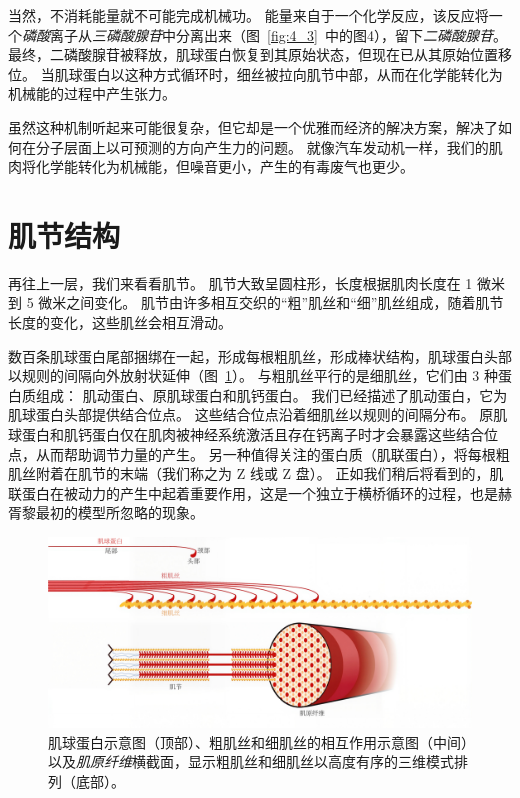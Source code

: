 当然，不消耗能量就不可能完成机械功。
能量来自于一个化学反应，该反应将一个\textit{磷酸}离子从\textit{三磷酸腺苷}中分离出来（图~\ref{fig:4_3}~中的图4），留下\textit{二磷酸腺苷}。
最终，二磷酸腺苷被释放，肌球蛋白恢复到其原始状态，但现在已从其原始位置移位。
当\textcolor[RGB]{198,9,5}{肌球蛋白}以这种方式循环时，细丝被拉向肌节中部，从而在化学能转化为机械能的过程中产生张力。


虽然这种机制听起来可能很复杂，但它却是一个优雅而经济的解决方案，解决了如何在分子层面上以可预测的方向产生力的问题。
就像汽车发动机一样，我们的肌肉将化学能转化为机械能，但噪音更小，产生的有毒废气也更少。



\section{肌节结构}

再往上一层，我们来看看肌节。
肌节大致呈圆柱形，长度根据肌肉长度在 1 微米到 5 微米之间变化。
肌节由许多相互交织的“粗”肌丝和“细”肌丝组成，随着肌节长度的变化，这些肌丝会相互滑动。


数百条肌球蛋白尾部捆绑在一起，形成每根粗肌丝，形成棒状结构，肌球蛋白头部以规则的间隔向外放射状延伸（图~\ref{fig:4_4}）。
与粗肌丝平行的是细肌丝，它们由 3 种蛋白质组成：
肌动蛋白、原肌球蛋白和肌钙蛋白。
我们已经描述了肌动蛋白，它为肌球蛋白头部提供结合位点。
这些结合位点沿着细肌丝以规则的间隔分布。
原肌球蛋白和肌钙蛋白仅在肌肉被神经系统激活且存在钙离子时才会暴露这些结合位点，从而帮助调节力量的产生。
另一种值得关注的蛋白质（肌联蛋白），将每根粗肌丝附着在肌节的末端（我们称之为 Z 线或 Z 盘）。
正如我们稍后将看到的，肌联蛋白在被动力的产生中起着重要作用，这是一个独立于横桥循环的过程，也是赫胥黎最初的模型所忽略的现象。

\begin{figure}[!htb]
	\centering
	\includegraphics[width=1.0\linewidth]{chap4/4_4}
	\caption{\textcolor[RGB]{198,9,5}{肌球蛋白}示意图（顶部）、\textcolor[RGB]{186,26,26}{粗肌丝}和\textcolor[RGB]{218,128,42}{细肌丝}的相互作用示意图（中间）以及\textit{肌原纤维}横截面，显示\textcolor[RGB]{186,26,26}{粗肌丝}和\textcolor[RGB]{218,128,42}{细肌丝}以高度有序的三维模式排列（底部）。 \label{fig:4_4}}
\end{figure}

